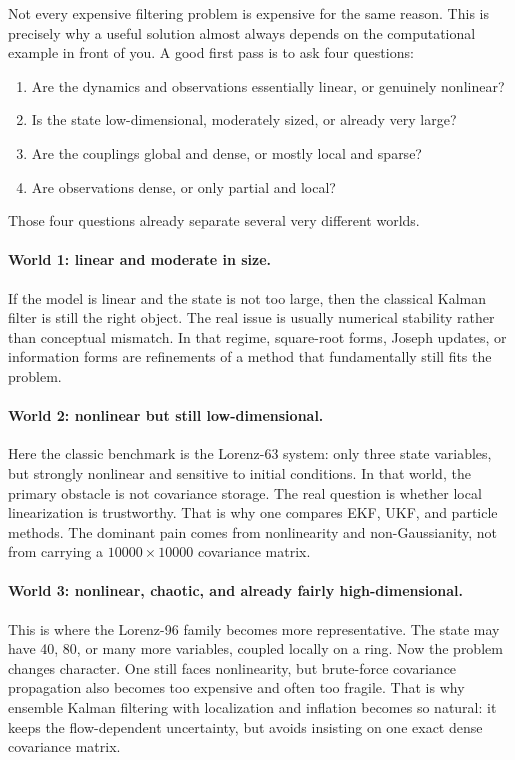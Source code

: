 \documentclass[12pt,a4paper]{article}
\begin{document}
Not every expensive filtering problem is expensive for the same reason. This is precisely why a useful solution almost always depends on the computational example in front of you. A good first pass is to ask four questions:
\begin{enumerate}
  \item Are the dynamics and observations essentially linear, or genuinely nonlinear?
  \item Is the state low-dimensional, moderately sized, or already very large?
  \item Are the couplings global and dense, or mostly local and sparse?
  \item Are observations dense, or only partial and local?
\end{enumerate}

Those four questions already separate several very different worlds.

\paragraph{World 1: linear and moderate in size.}
If the model is linear and the state is not too large, then the classical Kalman filter is still the right object. The real issue is usually numerical stability rather than conceptual mismatch. In that regime, square-root forms, Joseph updates, or information forms are refinements of a method that fundamentally still fits the problem.

\paragraph{World 2: nonlinear but still low-dimensional.}
Here the classic benchmark is the Lorenz-63 system: only three state variables, but strongly nonlinear and sensitive to initial conditions. In that world, the primary obstacle is not covariance storage. The real question is whether local linearization is trustworthy. That is why one compares EKF, UKF, and particle methods. The dominant pain comes from nonlinearity and non-Gaussianity, not from carrying a \(10000 \times 10000\) covariance matrix.

\paragraph{World 3: nonlinear, chaotic, and already fairly high-dimensional.}
This is where the Lorenz-96 family becomes more representative. The state may have 40, 80, or many more variables, coupled locally on a ring. Now the problem changes character. One still faces nonlinearity, but brute-force covariance propagation also becomes too expensive and often too fragile. That is why ensemble Kalman filtering with localization and inflation becomes so natural: it keeps the flow-dependent uncertainty, but avoids insisting on one exact dense covariance matrix.
\end{document}
